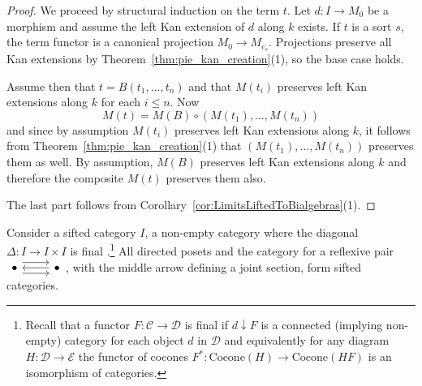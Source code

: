 \documentclass[11pt]{article}
\theoremstyle{plain}
\theoremstyle{definition}
\numberwithin{equation}{section}
\newcommand{\C}{\mathcal{C}}
\newcommand{\D}{\mathcal{D}}
\newcommand{\E}{\mathcal{E}}
\begin{document}
\begin{proof}
   We proceed by structural induction on the term $t$. Let $d\colon I\to M_0$ be a morphism and assume the left Kan extension of $d$ along $k$ exists. If $t$ is a sort $s$, the term functor is a canonical projection $M_0 \to M_{c_s}$. Projections preserve all Kan extensions by Theorem~\ref{thm:pie_kan_creation}(1), so the base case holds.

   Assume then that $t = B(t_1,\dots, t_n)$ and that $M(t_i)$ preserves left Kan extensions along $k$ for each $i\leq n$. Now
   $$
   M(t) = M(B)\circ (M(t_1),\dots, M(t_n))
   $$
   and since by assumption $M(t_i)$ preserves left Kan extensions along $k$, it follows from Theorem~\ref{thm:pie_kan_creation}(1) that $(M(t_1),\dots, M(t_n))$ preserves them as well. By assumption, $M(B)$ preserves left Kan extensions along $k$ and therefore the composite $M(t)$ preserves them also.

   The last part follows from Corollary~\ref{cor:LimitsLiftedToBialgebras}(1).
\end{proof}

Consider a sifted category $I$, a non-empty category where the diagonal $\Delta\colon I\to I\times I$ is final \cite{AdamekRosickyVitale2010SiftedColimits}.\footnote{Recall that a functor $F\colon \C\to \D$ is final if $d\downarrow F$ is a connected (implying non-empty) category for each object $d$ in $\D$ and equivalently for any diagram $H\colon \D\to \E$ the functor of cocones $F^*\colon \mathrm{Cocone}(H)\to \mathrm{Cocone}(HF)$ is an isomorphism of categories.} All directed posets and the category for a reflexive pair $\begin{tikzcd}
\bullet \arrow[r, shift left=2] \arrow[r, shift right=2] & \bullet \arrow[l]
\end{tikzcd}$, with the middle arrow defining a joint section, form sifted categories.
\end{document}
